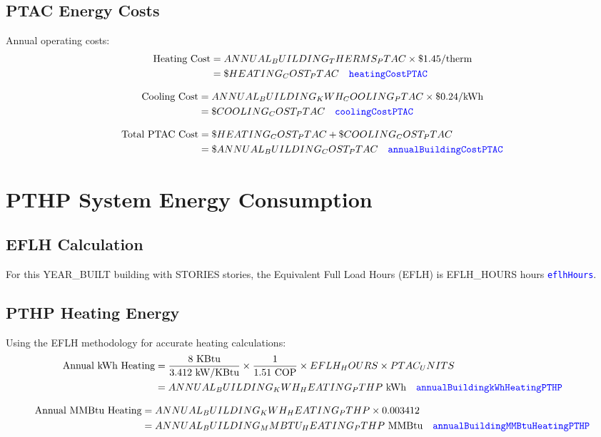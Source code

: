 \documentclass[11pt,letterpaper]{article}
\newcommand{\code}[1]{\textcolor{blue}{\texttt{#1}}}
\begin{document}
\subsection{PTAC Energy Costs}
Annual operating costs:
\begin{align}
\text{Heating Cost} &= {{ANNUAL_BUILDING_THERMS_PTAC}} \times \$1.45/\text{therm} \\
&= \${{HEATING_COST_PTAC}} \quad \code{heatingCostPTAC}
\end{align}

\begin{align}
\text{Cooling Cost} &= {{ANNUAL_BUILDING_KWH_COOLING_PTAC}} \times \$0.24/\text{kWh} \\
&= \${{COOLING_COST_PTAC}} \quad \code{coolingCostPTAC}
\end{align}

\begin{align}
\text{Total PTAC Cost} &= \${{HEATING_COST_PTAC}} + \${{COOLING_COST_PTAC}} \\
&= \${{ANNUAL_BUILDING_COST_PTAC}} \quad \code{annualBuildingCostPTAC}
\end{align}

\section{PTHP System Energy Consumption}

\subsection{EFLH Calculation}
For this {{YEAR_BUILT}} building with {{STORIES}} stories, the Equivalent Full Load Hours (EFLH) is {{EFLH_HOURS}} hours \quad \code{eflhHours}.

\subsection{PTHP Heating Energy}
Using the EFLH methodology for accurate heating calculations:
\begin{align}
\text{Annual kWh Heating} &= \frac{8 \text{ KBtu}}{3.412 \text{ kW/KBtu}} \times \frac{1}{1.51 \text{ COP}} \times {{EFLH_HOURS}} \times {{PTAC_UNITS}} \\
&= {{ANNUAL_BUILDING_KWH_HEATING_PTHP}} \text{ kWh} \quad \code{annualBuildingkWhHeatingPTHP}
\end{align}

\begin{align}
\text{Annual MMBtu Heating} &= {{ANNUAL_BUILDING_KWH_HEATING_PTHP}} \times 0.003412 \\
&= {{ANNUAL_BUILDING_MMBTU_HEATING_PTHP}} \text{ MMBtu} \quad \code{annualBuildingMMBtuHeatingPTHP}
\end{align}
\end{document}
